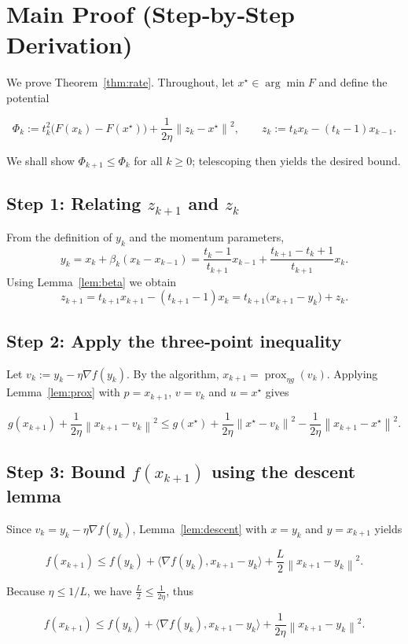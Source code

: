 \documentclass{article}
\newcommand{\prox}{\operatorname{prox}}
\newcommand{\norm}[1]{\left\lVert#1\right\rVert}
\begin{document}
\newpage
\section*{Main Proof (Step‑by‑Step Derivation)}
We prove Theorem~\ref{thm:rate}. Throughout, let $x^{\star}\in\arg\min F$ and define the
potential  

\[
\Phi_k:= t_k^{2}\bigl(F(x_k)-F(x^{\star})\bigr)
        +\frac{1}{2\eta}\norm{z_k-x^{\star}}^{2},
\qquad 
z_k:=t_k x_k-(t_k-1)x_{k-1}.
\tag{P0}
\]

We shall show $\Phi_{k+1}\le\Phi_k$ for all $k\ge0$; telescoping then yields the
desired bound.

\subsection*{Step 1: Relating $z_{k+1}$ and $z_k$}
From the definition of $y_k$ and the momentum parameters,
\[
y_k = x_k + \beta_k (x_k-x_{k-1})
    = \frac{t_k-1}{t_{k+1}}x_{k-1} + \frac{t_{k+1}-t_k+1}{t_{k+1}}x_k .
\tag{1}
\]
Using Lemma~\ref{lem:beta} we obtain
\[
z_{k+1}=t_{k+1}x_{k+1}-(t_{k+1}-1)x_k
      = t_{k+1}\bigl(x_{k+1}-y_k\bigr)+z_k .
\tag{2}
\]

\subsection*{Step 2: Apply the three‑point inequality}
Let $v_k:=y_k-\eta\nabla f(y_k)$. By the algorithm,
$x_{k+1}= \prox_{\eta g}(v_k)$.  
Applying Lemma~\ref{lem:prox} with $p=x_{k+1}$, $v=v_k$ and $u=x^{\star}$ gives  

\[
g(x_{k+1})+\frac{1}{2\eta}\norm{x_{k+1}-v_k}^{2}
\le g(x^{\star})+\frac{1}{2\eta}\norm{x^{\star}-v_k}^{2}
-\frac{1}{2\eta}\norm{x_{k+1}-x^{\star}}^{2}.
\tag{3}
\]

\subsection*{Step 3: Bound $f(x_{k+1})$ using the descent lemma}
Since $v_k = y_k-\eta\nabla f(y_k)$, Lemma~\ref{lem:descent} with $x=y_k$ and $y=x_{k+1}$ yields  

\[
f(x_{k+1})\le f(y_k)+\langle\nabla f(y_k),x_{k+1}-y_k\rangle
            +\frac{L}{2}\norm{x_{k+1}-y_k}^{2}.
\tag{4}
\]

Because $\eta\le 1/L$, we have $\frac{L}{2}\le\frac{1}{2\eta}$, thus

\[
f(x_{k+1})\le f(y_k)+\langle\nabla f(y_k),x_{k+1}-y_k\rangle
            +\frac{1}{2\eta}\norm{x_{k+1}-y_k}^{2}.
\tag{5}
\]
\end{document}
